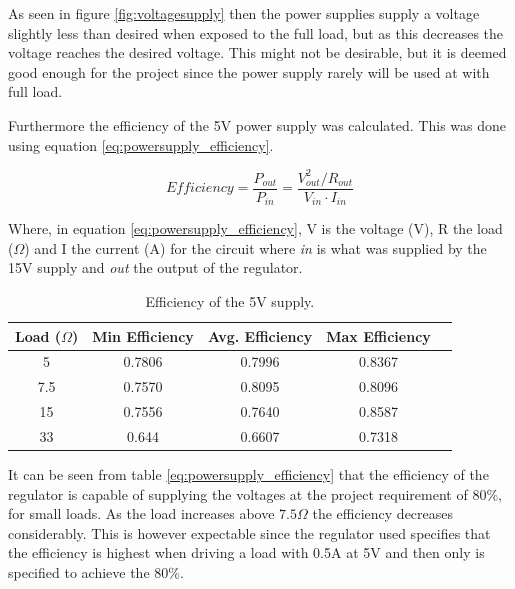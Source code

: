 As seen in figure \ref{fig:voltagesupply} then the power supplies supply a voltage slightly less than desired when exposed to the full load, but as this decreases the voltage reaches the desired voltage.
This might not be desirable, but it is deemed good enough for the project since the power supply rarely will be used at with full load.


Furthermore the efficiency of the 5V power supply was calculated.
This was done using equation \ref{eq:powersupply_efficiency}.

\begin{equation}
Efficiency = \frac{P_{out}}{P_{in}} = \frac{V_{out}^2 / R_{out}}{V_{in} \cdot I_{in}}
\label{eq:powersupply_efficiency}
\end{equation}

Where, in equation \ref{eq:powersupply_efficiency}, V is the voltage (V), R the load ($\Omega$) and I the current (A) for the circuit where \textit{in} is what was supplied by the 15V supply and \textit{out} the output of the regulator.


\begin{table}[H]
\centering
\begin{tabular}{|c|c|c|c|c|}
\hline
Load ($\Omega$) & Min Efficiency & Avg. Efficiency & Max Efficiency \\ \hline
5 & 0.7806 & 0.7996 & 0.8367 \\ \hline
7.5 & 0.7570 & 0.8095 & 0.8096 \\ \hline
15 & 0.7556 & 0.7640 & 0.8587 \\ \hline
33 & 0.644 & 0.6607 & 0.7318 \\ \hline
\end{tabular}
\caption{Efficiency of the 5V supply.}
\label{tab:voltageefficiency}
\end{table}

It can be seen from table \ref{eq:powersupply_efficiency} that the efficiency of the regulator is capable of supplying the voltages at the project requirement of 80\%, for small loads.
As the load increases above $7.5\Omega$ the efficiency decreases considerably.
This is however expectable since the regulator used specifies that the efficiency is highest when driving a load with 0.5A at 5V and then only is specified to achieve the 80\%.
